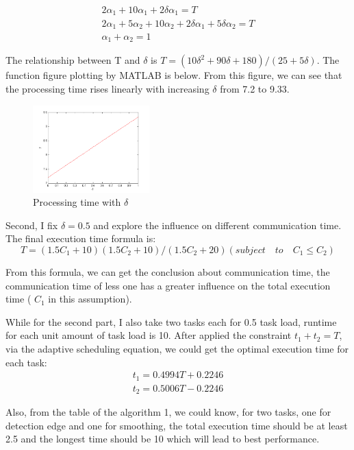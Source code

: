 \documentclass[twocolumn]{article}
\begin{document}
\begin{eqnarray}
2\alpha_1+10\alpha_1+2\delta\alpha_1=T \nonumber\\
2\alpha_1+5\alpha_2+10\alpha_2+2\delta\alpha_1+5\delta\alpha_2=T\nonumber\\
\alpha_1+\alpha_2 =1\nonumber
\end{eqnarray}

The relationship between T and $\delta$ is $T=(10\delta^2+90\delta+180)/(25+5\delta)$. The function figure plotting by MATLAB is below. From this figure, we can see that the processing time rises linearly with increasing $\delta$ from 7.2 to 9.33.

\begin{figure}[H]
\centering
  \includegraphics[width=0.4\textwidth]{csn3.png}
\caption{Processing time with $\delta$}
\end{figure}

Second, I fix $\delta=0.5$ and explore the influence on different communication time. The final execution time formula is:
\begin{equation*}
T=(1.5C_1+10)(1.5C_2+10)/(1.5C_2+20) (subject \quad to \quad C_1\le C_2)
\end{equation*}

From this formula, we can get the conclusion about communication time, the communication time of less one has a greater influence on the total execution time ( $C_1$ in this assumption). 


While for the second part, I also take two tasks each for 0.5 task load, runtime for each unit amount of task load is 10. After applied the constraint $t_1 + t_2 = T$, via the adaptive scheduling equation, we could get the optimal execution time for each task:
\begin{eqnarray}
t_1 = 0.4994T+0.2246 \nonumber \\
t_2 = 0.5006T-0.2246 \nonumber
\end{eqnarray}

Also, from the table of the algorithm 1, we could know, for two tasks, one for detection edge and one for smoothing, the total execution time should be at least 2.5 and the longest time should be 10 which will lead to best performance.
\end{document}
